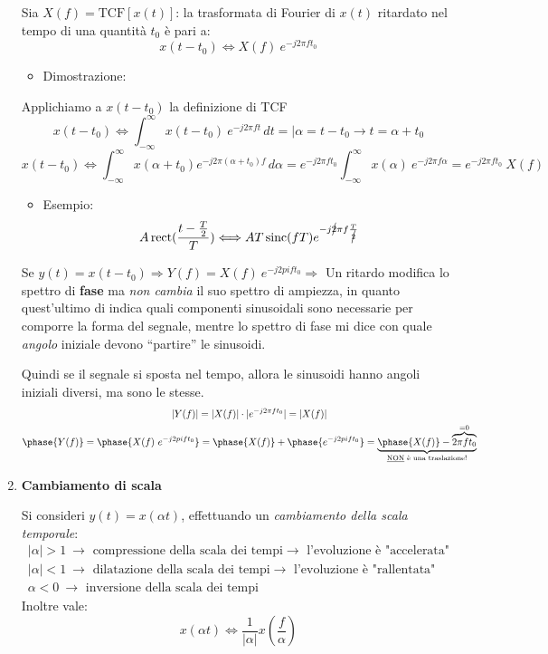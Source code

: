 \documentclass[
  paper=a4,
  ,captions=tableheading
]{scrartcl}
\providecommand{\tightlist}{%
  \setlength{\itemsep}{0pt}\setlength{\parskip}{0pt}}
\begin{document}
\begin{enumerate}
  Sia \(X(f)=\text{TCF}[x(t)]\): la trasformata di Fourier di \(x(t)\)
  ritardato nel tempo di una quantità \(t_0\) è pari a: \[
  x(t-t_0) \Longleftrightarrow X(f) \ e^{-j2\pi ft_0}
  \]

  \begin{itemize}
  \tightlist
  \item
    Dimostrazione:
  \end{itemize}

  Applichiamo a \(x(t-t_0)\) la definizione di TCF \[
  x(t-t_0) \Longleftrightarrow \int_{-\infty}^{\infty} x(t-t_0) \ e^{-j2\pi ft} \,dt = \Big|\alpha = t-t_0 \to t=\alpha +t_0
  \] \[
  x(t-t_0) \Longleftrightarrow \int_{-\infty}^{\infty} x(\alpha + t_0) e^{-j2\pi (\alpha +t_0)f} \,d\alpha = e^{-j2\pi ft_0} \int_{-\infty}^{\infty} x(\alpha)\ e^{-j2\pi f\alpha} =  e^{-j2\pi ft_0} \ X(f) 
  \]

  \begin{itemize}
  \tightlist
  \item
    Esempio: \[
    A\mathop{\mathrm{rect}}(\frac{t-\frac{T}{2}}{T}) \Longleftrightarrow AT\mathop{\mathrm{sinc}}(fT)e^{-j\cancel{2}\pi f\frac{T}{\cancel{2}}}
    \]
  \end{itemize}

  Se
  \(y(t)=x(t-t_0) \Rightarrow Y(f) = X(f) \ e^{-j2 pi ft_0} \Rightarrow\)
  Un ritardo modifica lo spettro di \textbf{fase} ma \emph{non cambia}
  il suo spettro di ampiezza, in quanto quest'ultimo di indica quali
  componenti sinusoidali sono necessarie per comporre la forma del
  segnale, mentre lo spettro di fase mi dice con quale \emph{angolo}
  iniziale devono ``partire'' le sinusoidi.

  Quindi se il segnale si sposta nel tempo, allora le sinusoidi hanno
  angoli iniziali diversi, ma sono le stesse. \begin{gather*}
  |Y(f)| = |X(f)|\cdot |e^{-j2\pi ft_0}| = |X(f)| \\
  \phase{Y(f)} = \phase{X(f) \ e^{-j2 pi ft_0}} = \phase{X(f)} + \phase{e^{-j2 pi ft_0}} = \underbrace{\phase{X(f)} - \overbrace{2\pi ft_0}^{=0}}_{\text{\underline{NON} è una traslazione!}}
  \end{gather*}
\item
  \textbf{Cambiamento di scala}

  Si consideri \(y(t)=x(\alpha t)\), effettuando un \emph{cambiamento
  della scala temporale}: \[
  \begin{array}{cl}
  |\alpha | > 1 \ \to \text{ compressione della scala dei tempi} \to \text{ l'evoluzione è "accelerata"}\\
  |\alpha | < 1 \ \to \text{ dilatazione della scala dei tempi} \to \text{ l'evoluzione è "rallentata"}\\
  \alpha  < 0 \ \to \text{ inversione della scala dei tempi}
  \end{array} 
  \] Inoltre vale: \[
  x(\alpha t) \Longleftrightarrow \frac{1}{|\alpha |} x(\frac{f}{\alpha})
  \]


\end{enumerate}
\end{document}
